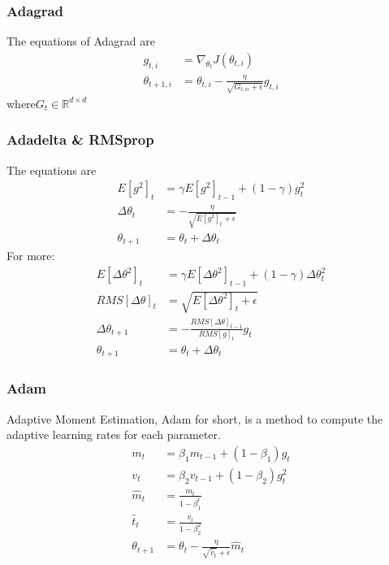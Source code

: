 \documentclass[twoside]{article}
\begin{document}
\subsubsection{Adagrad}
\label{sec:gd:gdoa:adarad}

The equations of Adagrad are
\begin{align*}
g_{t,i} &= \nabla_{\theta_t}J(\theta_{t,i}) \\
\theta_{t+1,i} &= \theta_{t,i} - \frac{\eta}{\sqrt{G_{t,ii}+\epsilon}} g_{t,i}
\end{align*}
where$G_t\in \mathbb{R}^{d\times d}$

\subsubsection{Adadelta \& RMSprop}
\label{sec:gd:gdoa:adadelta}

The equations are
\begin{align*}
E[g^2]_t &= \gamma E[g^2]_{t-1} + (1-\gamma)g_t^2 \\
\Delta\theta_t & = - \frac{\eta}{\sqrt{E[g^2]_t + \epsilon}} \\
\theta_{t+1} &= \theta_t + \Delta \theta_t
\end{align*}
For more:
\begin{align*}
E[\Delta\theta^2]_t &= \gamma E[\Delta\theta^2]_{t-1} + (1-\gamma)\Delta\theta_t^2 \\
RMS[\Delta\theta]_t &= \sqrt{E[\Delta\theta^2]_t+\epsilon} \\
\Delta\theta_{t+1}& = -\frac{RMS[\Delta\theta]_{t-1}}{RMS[g]_t}g_t \\
\theta_{t+1} &= \theta_t + \Delta\theta_t
\end{align*}

\subsubsection{Adam}
\label{sec:gd:gdoa:adam}

Adaptive Moment Estimation, Adam for short, is a method to compute the adaptive learning rates for each parameter.
\begin{align*}
m_t &= \beta_1m_{t-1}+(1-\beta_1)g_t \\
v_t &= \beta_2v_{t-1} + (1-\beta_2)g_t^2 \\
\hat{m}_t &= \frac{m_t}{1-\beta^t_1} \\
\hat{t}_t &= \frac{v_t}{1-\beta_2^2} \\
\theta_{t+1} &= \theta_t - \frac{\eta}{\sqrt{\hat{v}_t}+\epsilon}\hat{m}_t
\end{align*}
\end{document}
